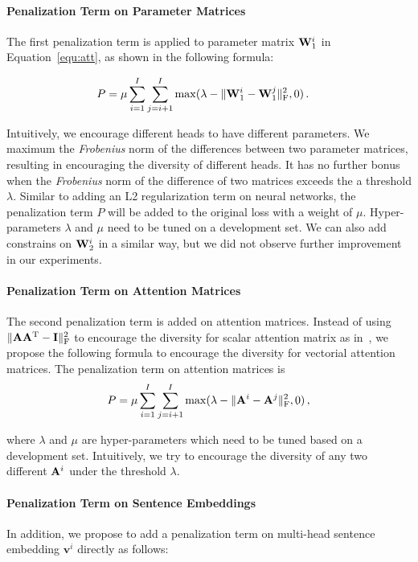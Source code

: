 \documentclass[11pt]{article}
\newcommand{\vect}[1]{\bm{#1}}
\newcommand{\mat}[1]{\bf{#1}}
\begin{document}
\paragraph{Penalization Term on Parameter Matrices}
The first penalization term is applied to parameter matrix ${\mat W}^i_1$ in Equation~\ref{equ:att}, as shown in the following formula:

\begin{align}
P &= \mu \sum_{i=1}^{I}\sum_{j=i+1}^{I}\max(\lambda -\lVert {\mat W}^i_1 - {\mat W}^j_1 \rVert_\mathrm{F}^2, 0) \,.
\end{align}

Intuitively, we encourage different heads to have different parameters. We maximum the \textit{Frobenius} norm of the differences between two parameter matrices, resulting in encouraging the diversity of different heads.
It has no further bonus when the \textit{Frobenius} norm of the difference of two matrices exceeds the a threshold $\lambda$.
Similar to adding an L2 regularization term on neural networks, the penalization term $P$ will be added to the original loss with a weight of $\mu$. Hyper-parameters $\lambda$ and $\mu$ need to be tuned on a development set. We can also add constrains on ${\mat W}^i_2$ in a similar way, but we did not observe further improvement in our experiments. 

\paragraph{Penalization Term on Attention Matrices}
The second penalization term is added on attention matrices. Instead of using $\lVert{\mat A} {\mat A}^\mathrm{T} - {\mat I}\rVert_\mathrm{F}^2$ to encourage the diversity for scalar attention matrix as in~, we propose the following formula to encourage the diversity for vectorial attention matrices. The penalization term on attention matrices is 
\begin{align}
P = \mu \sum_{i=1}^{I}\sum_{j=i+1}^{I}\max(\lambda -\lVert {\mat A}^i - {\mat A}^j \rVert_\mathrm{F}^2, 0) \,,
\end{align}

\noindent where $\lambda$ and $\mu$ are hyper-parameters which need to be tuned based on a development set. Intuitively, we try to encourage the  diversity of any two different ${\mat A}^i$ under the threshold $\lambda$. 

\paragraph{Penalization Term on Sentence Embeddings}
In addition, we propose to add a penalization term on multi-head sentence embedding ${\vect v}^i$ directly as follows:
\end{document}
